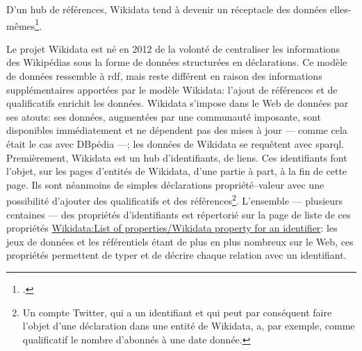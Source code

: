 \begin{citationLongue}
	D’un hub de références, Wikidata tend à devenir un réceptacle des données elles-mêmes\footcite{poupeau_au-a_2018}.
\end{citationLongue}
\medskip

Le projet Wikidata est né en 2012 de la volonté de centraliser les informations des Wikipédias sous la forme de données structurées en déclarations. Ce modèle de données ressemble à \ac{rdf}, mais reste différent en raison des informations supplémentaires apportées par le modèle Wikidata: l'ajout de références et de qualificatifs enrichit les données. Wikidata s'impose dans le Web de données par ses atouts: ses données, augmentées par une communauté imposante, sont disponibles immédiatement et ne dépendent pas des mises à jour --- comme cela était le cas avec DBpédia ---; les données de Wikidata se requêtent avec \ac{sparql}.\\

Premièrement, Wikidata est un hub d'identifiants, de liens. Ces identifiants font l'objet, sur les pages d'entités de Wikidata, d'une partie à part, à la fin de cette page. Ils sont néanmoins de simples déclarations propriété--valeur avec une possibilité d'ajouter des qualificatifs et des références\footnote{Un compte Twitter, qui a un identifiant et qui peut par conséquent faire l'objet d'une déclaration dans une entité de Wikidata, a, par exemple, comme qualificatif le nombre d'abonnés à une date donnée.}.
L'ensemble --- plusieurs centaines --- des propriétés d'identifiants est répertorié sur la page de liste de ces propriétés \href{https://www.wikidata.org/wiki/Wikidata:List_of_properties/Wikidata_property_for_an_identifier}{Wikidata:List of properties/Wikidata property for an identifier}: les jeux de données et les référentiels étant de plus en plus nombreux sur le Web, ces propriétés permettent de typer et de décrire chaque relation avec un identifiant.\\

